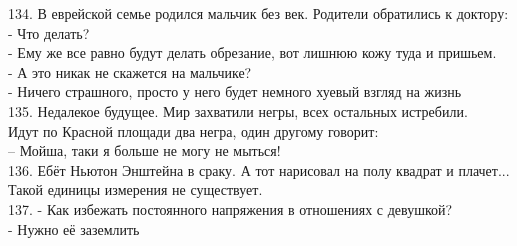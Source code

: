 \documentclass[a4paper,20pt,notitlepage]{extbook}
\begin{document}
	134. В еврейской семье родился мальчик без век. Родители обратились к доктору:\\
	- Что делать?\\
	- Ему же все равно будут делать обрезание, вот лишнюю кожу туда и пришьем.\\
	- А это никак не скажется на мальчике?\\
	- Ничего страшного, просто у него будет немного хуевый взгляд на жизнь\\
	
	135. Недалекое будущее. Мир захватили негры, всех остальных истребили.\\
	Идут по Красной площади два негра, один другому говорит:\\
	– Мойша, таки я больше не могу не мыться!\\
	
	136. Ебёт Ньютон Энштейна в сраку. А тот нарисовал на полу квадрат и плачет...\\
	Такой единицы измерения не существует.\\
	
	137. - Как избежать постоянного напряжения в отношениях с девушкой?\\
	\quad- Нужно её заземлить\\
	
\end{document}
